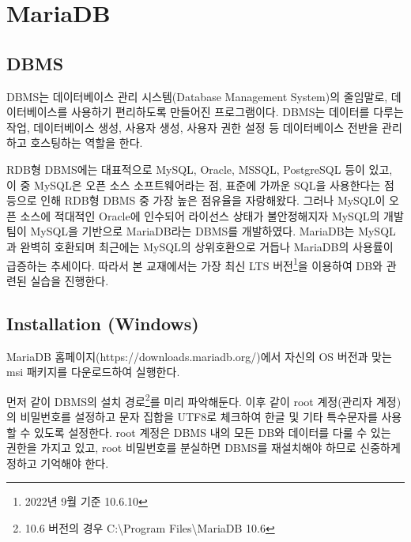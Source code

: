 \section{MariaDB}\label{sect:maria-db}

\subsection*{DBMS}

DBMS는 데이터베이스 관리 시스템(Database Management System)의 줄임말로, 데이터베이스를 사용하기 편리하도록 만들어진 프로그램이다. DBMS는 데이터를 다루는 작업, 데이터베이스 생성, 사용자 생성, 사용자 권한 설정 등 데이터베이스 전반을 관리하고 호스팅하는 역할을 한다.

RDB형 DBMS에는 대표적으로 MySQL, Oracle, MSSQL, PostgreSQL 등이 있고, 이 중 MySQL은 오픈 소스 소프트웨어라는 점, 표준에 가까운 SQL을 사용한다는 점 등으로 인해 RDB형 DBMS 중 가장 높은 점유율을 자랑해왔다. 그러나 MySQL이 오픈 소스에 적대적인 Oracle에 인수되어 라이선스 상태가 불안정해지자 MySQL의 개발팀이 MySQL을 기반으로 MariaDB라는 DBMS를 개발하였다. MariaDB는 MySQL과 완벽히 호환되며 최근에는 MySQL의 상위호환으로 거듭나 MariaDB의 사용률이 급증하는 추세이다. 따라서 본 교재에서는 가장 최신 LTS 버전\footnote{2022년 9월 기준 10.6.10}을 이용하여 DB와 관련된 실습을 진행한다.

\subsection*{Installation (Windows)}

MariaDB 홈페이지(https://downloads.mariadb.org/)에서 자신의 OS 버전과 맞는 msi 패키지를 다운로드하여 실행한다.


먼저 \과 같이 DBMS의 설치 경로\footnote{10.6 버전의 경우 C:\textbackslash{}Program Files\textbackslash{}MariaDB 10.6}를 미리 파악해둔다. 이후 \와 같이 root 계정(관리자 계정)의 비밀번호를 설정하고 문자 집합을 UTF8로 체크하여 한글 및 기타 특수문자를 사용할 수 있도록 설정한다. root 계정은 DBMS 내의 모든 DB와 데이터를 다룰 수 있는 권한을 가지고 있고, root 비밀번호를 분실하면 DBMS를 재설치해야 하므로 신중하게 정하고 기억해야 한다.

